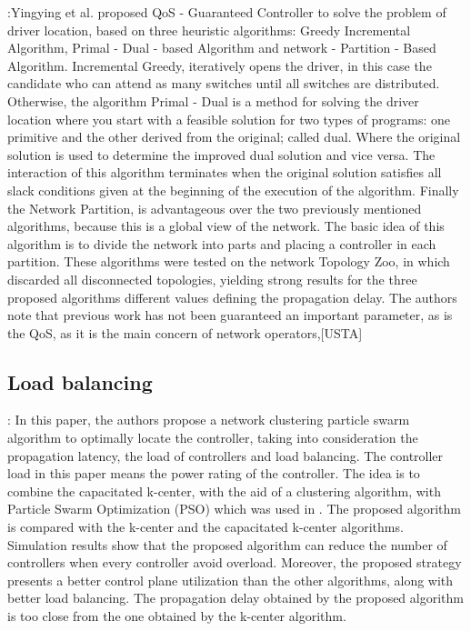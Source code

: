 \documentclass[a4paper,10pt]{article}
\begin{document}
\cite{ChWa15}:Yingying et al. proposed QoS - Guaranteed Controller to solve the problem of driver location, based on three heuristic algorithms: Greedy Incremental Algorithm, Primal - Dual - based Algorithm and network - Partition - Based Algorithm. Incremental Greedy, iteratively opens the driver, in this case the candidate who can attend as many switches until all switches are distributed. Otherwise, the algorithm Primal - Dual is a method for solving the driver location where you start with a feasible solution for two types of programs: one primitive and the other derived from the original; called dual. Where the original solution is used to determine the improved dual solution and vice versa. The interaction of this algorithm terminates when the original solution satisfies all slack conditions given at the beginning of the execution of the algorithm. Finally the Network Partition, is advantageous over the two previously mentioned algorithms, because this is a global view of the network. The basic idea of this algorithm is to divide the network into parts and placing a controller in each partition. These algorithms were tested on the network Topology Zoo, in which discarded all disconnected topologies, yielding strong results for the three proposed algorithms different values defining the propagation delay. The authors note that previous work has not been guaranteed an important parameter, as is the QoS, as it is the main concern of network operators,[USTA]

\subsection{Load balancing}

\cite{LiWa15}: In this paper, the authors propose a network clustering particle swarm algorithm to optimally locate the controller, taking into consideration the propagation latency, the load of controllers and load balancing. The controller load in this paper means the power rating of the controller. The idea is to combine the capacitated k-center, with the aid of a clustering algorithm, with Particle Swarm Optimization (PSO) which was used in \cite{GaWa15}. The proposed algorithm is compared with the k-center and the capacitated k-center algorithms. Simulation results show that the proposed algorithm can reduce the number of controllers when every controller avoid overload. Moreover, the proposed strategy presents a better control plane utilization than the other algorithms, along with better load balancing. The propagation delay obtained by the proposed algorithm is too close from the one obtained by the k-center algorithm. 
\end{document}
